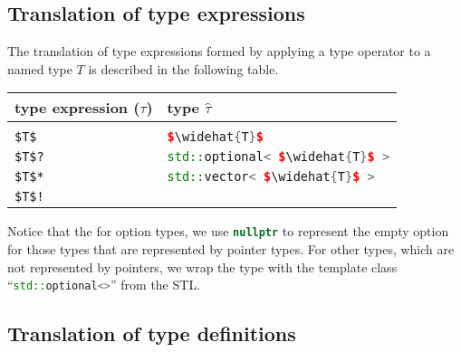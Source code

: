 \subsection{Translation of type expressions}

The translation of \asdl{} type expressions formed by applying a type operator to
a named type $T$ is described in the following table.
%
\begin{center}
  \begin{tabular}{|p{2in}|p{3in}|}
    \hline
      \textbf{\asdl{} type expression ($\tau$)} &  \textbf{\Cplusplus{} type $\widehat{\tau}$} \\[0.25em]
    \hline
      \mbox{} & \\[-1em]
      \lstinline[language=ASDL,mathescape=true]@$T$@ & \lstinline[language=c++,mathescape=true]@$\widehat{T}$@ \\[0.5em]
      \lstinline[language=ASDL,mathescape=true]@$T$?@ &
        \lstinline[language=c++,mathescape=true]@std::optional< $\widehat{T}$ >@ \\[0.5em]
      \lstinline[language=ASDL,mathescape=true]@$T$*@ & \lstinline[language=c++,mathescape=true]@std::vector< $\widehat{T}$ >@ \\[0.5em]
      \lstinline[language=ASDL,mathescape=true]@$T$!@ & \\[0.25em]
    \hline
  \end{tabular}%
\end{center}%
%
Notice that the for option types, we use \lstinline[language=c++]@nullptr@ to
represent the empty option for those \asdl{} types that are represented by
\Cplusplus{} pointer types.
For other \asdl{} types, which are not represented by pointers, we wrap the type
with the template class ``\lstinline[language=c++]@std::optional<>@''
from the \Cplusplus{} STL.

\subsection{Translation of type definitions}

